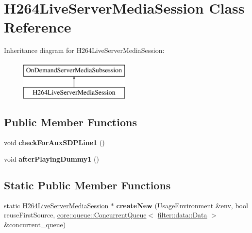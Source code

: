 \hypertarget{class_h264_live_server_media_session}{}\section{H264\+Live\+Server\+Media\+Session Class Reference}
\label{class_h264_live_server_media_session}
Inheritance diagram for H264\+Live\+Server\+Media\+Session\+:\begin{figure}[H]
\begin{center}
\leavevmode
\includegraphics[height=2.000000cm]{df/d19/class_h264_live_server_media_session}
\end{center}
\end{figure}
\subsection*{Public Member Functions}
\begin{DoxyCompactItemize}
\item 
\mbox{\label{class_h264_live_server_media_session_a425e58c77868ccf7652acb31357f0f6f}} 
void {\bfseries check\+For\+Aux\+S\+D\+P\+Line1} ()
\item 
\mbox{\label{class_h264_live_server_media_session_a2837de6c0e367b8233d0d608446c7054}} 
void {\bfseries after\+Playing\+Dummy1} ()
\end{DoxyCompactItemize}
\subsection*{Static Public Member Functions}
\begin{DoxyCompactItemize}
\item 
\mbox{\label{class_h264_live_server_media_session_ac0b145c580d8a63a8fb61ba973d8e9b8}} 
static \hyperlink{class_h264_live_server_media_session}{H264\+Live\+Server\+Media\+Session} $\ast$ {\bfseries create\+New} (Usage\+Environment \&env, bool reuse\+First\+Source, \hyperlink{classcore_1_1queue_1_1_concurrent_queue}{core\+::queue\+::\+Concurrent\+Queue}$<$ \hyperlink{classfilter_1_1data_1_1_data}{filter\+::data\+::\+Data} $>$ \&concurrent\+\_\+queue)
\end{DoxyCompactItemize}
